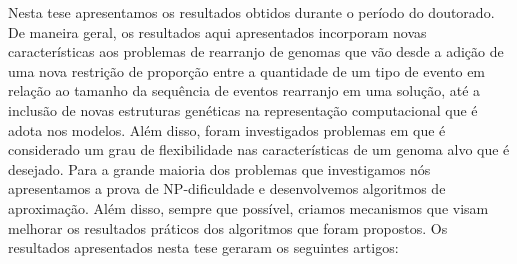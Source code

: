 
Nesta tese apresentamos os resultados obtidos durante o período do doutorado. De maneira geral, os resultados aqui apresentados incorporam novas características aos problemas de rearranjo de genomas que vão desde a adição de uma nova restrição de proporção entre a quantidade de um tipo de evento em relação ao tamanho da sequência de eventos rearranjo em uma solução, até a inclusão de novas estruturas genéticas na representação computacional que é adota nos modelos. Além disso, foram investigados problemas em que é considerado um grau de flexibilidade nas características de um genoma alvo que é desejado. Para a grande maioria dos problemas que investigamos nós apresentamos a prova de NP-dificuldade e desenvolvemos algoritmos de aproximação. Além disso, sempre que possível, criamos mecanismos que visam melhorar os resultados práticos dos algoritmos que foram propostos. Os resultados apresentados nesta tese geraram os seguintes artigos:

